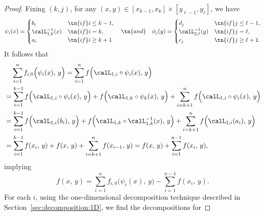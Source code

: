 \documentclass[review,hidelinks,onefignum,onetabnum]{siamart250211}
\begin{document}
\begin{proof}%
Fixing $(k,j)$, for any $(x,y)\in [x_{k-1}, x_k]\times [y_{\ell-1}, y_\ell]$, we have
\begin{equation*}
    \psi_i(x)=\begin{cases}
        b_i &\tn{if  }i\le k-1,\\
        \calL_{1,k}^{-1}(x) &\tn{if  }i= k ,\\
        a_i &\tn{if  }i\ge k+1 
    \end{cases}
        \quad \tn{and}\quad 
        \phi_j(y)=\begin{cases}
        d_j &\tn{if  } j \le \ell-1,\\
        \calL_{2,\ell}^{-1}(y) &\tn{if  } j=\ell,\\
        c_j &\tn{if  } j\ge \ell+1.
    \end{cases}
\end{equation*}
It follows that 
\begin{equation*}
    \begin{split}
          &\phantom{=\;}\sum_{i=1}^n f_{i,0}\Big( \psi_i(x), \, y\Big)
        = \sum_{i=1}^n f\Big( \calL_{1,i}\circ \psi_i(x), \, y\Big)
        \\
        &=
        \sum_{i=1}^{k-1} f\Big( \calL_{1,i}\circ \psi_i(x), \, y\Big)
        +f\Big( \calL_{1,k}\circ \psi_k(x), \, y\Big)
        +
        \sum_{i=k+1}^n f\Big( \calL_{1,i}\circ \psi_i(x), \, y \Big)
        \\
        &=
        \sum_{i=1}^{k-1} f\Big( \calL_{1,i}(b_i), \, y\Big)
        +f\Big( \calL_{1,k}\circ \calL_{1,k}^{-1}(x), \, y\Big)
        +
        \sum_{i=k+1}^n f\Big( \calL_{1,i}(a_i), \, y\Big)
        \\
        &=
        \sum_{i=1}^{k-1} f( x_i, \, y)
        +f( x, \, y)
        +
        \sum_{i=k+1}^n f( x_{i-1}, \, y)
=
        f( x, \, y)
        +\sum_{i=1}^{n-1} f( x_i, \, y),
    \end{split}
\end{equation*}
implying 
\begin{equation*}
        f( x, \, y)=\sum_{i=1}^n f_{i,0}\Big( \psi_i(x), \, y\Big)-  \sum_{i=1}^{n-1} f( x_i, \, y).
\end{equation*}
For each \(i\), using the one-dimensional decomposition technique described in Section~\ref{sec:decomposition:1D}, we find the decompositions for 

\end{proof}
\end{document}
